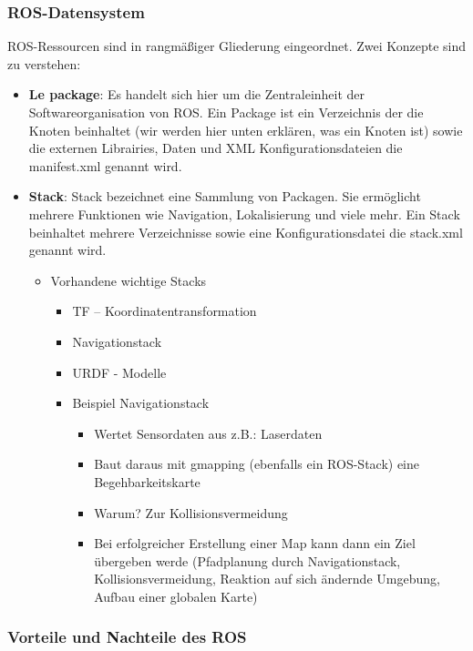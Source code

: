 \subsubsection{ROS-Datensystem}
ROS-Ressourcen sind in rangmäßiger Gliederung eingeordnet. Zwei Konzepte sind zu
verstehen:
\begin{itemize}
\item \textbf{Le package}: Es handelt sich hier um die Zentraleinheit der Softwareorganisation von
ROS. Ein Package ist ein Verzeichnis der die Knoten beinhaltet (wir werden hier
unten erklären, was ein Knoten ist) sowie die externen Librairies, Daten und XML
Konfigurationsdateien die manifest.xml genannt wird.
\item \textbf{Stack}: Stack bezeichnet eine Sammlung von Packagen. Sie ermöglicht mehrere
Funktionen wie Navigation, Lokalisierung und viele mehr. Ein Stack beinhaltet
mehrere Verzeichnisse sowie eine Konfigurationsdatei die stack.xml genannt wird.
\begin{itemize}
\item Vorhandene wichtige Stacks
\begin{itemize}
\item TF – Koordinatentransformation
\item Navigationstack
\item URDF - Modelle
\end{itemize}
\begin{itemize}
\item Beispiel Navigationstack
\begin{itemize}
\item Wertet Sensordaten aus z.B.: Laserdaten
\item Baut daraus mit gmapping (ebenfalls ein ROS-Stack) eine Begehbarkeitskarte
\item Warum? Zur Kollisionsvermeidung
\item Bei erfolgreicher Erstellung einer Map kann dann ein Ziel übergeben werde (Pfadplanung durch Navigationstack,
Kollisionsvermeidung, Reaktion auf sich ändernde Umgebung, Aufbau einer globalen Karte)
\end{itemize}
\end{itemize}
\end{itemize}
\end{itemize}
\subsubsection{Vorteile und Nachteile des ROS}
